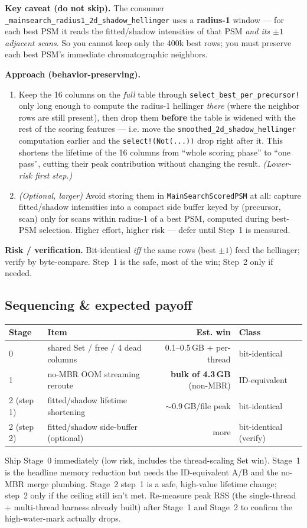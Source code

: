 \documentclass[11pt]{article}
\newcommand{\code}[1]{\texttt{\small #1}}
\begin{document}
\textbf{Key caveat (do not skip).} The consumer
\code{\_mainsearch\_radius1\_2d\_shadow\_hellinger} uses a \textbf{radius-1} window --- for each
best PSM it reads the fitted/shadow intensities of that PSM \emph{and its $\pm1$ adjacent scans}.
So you cannot keep only the 400k best rows; you must preserve each best PSM's immediate
chromatographic neighbors.

\textbf{Approach (behavior-preserving).}
\begin{enumerate}
  \item Keep the 16 columns on the \emph{full} table through \code{select\_best\_per\_precursor!}
  only long enough to compute the radius-1 hellinger \emph{there} (where the neighbor rows are
  still present), then drop them \textbf{before} the table is widened with the rest of the
  scoring features --- i.e. move the \code{smoothed\_2d\_shadow\_hellinger} computation earlier
  and the \code{select!(Not(...))} drop right after it. This shortens the lifetime of the 16
  columns from ``whole scoring phase'' to ``one pass'', cutting their peak contribution without
  changing the result. \emph{(Lower-risk first step.)}
  \item \emph{(Optional, larger)} Avoid storing them in \code{MainSearchScoredPSM} at all:
  capture fitted/shadow intensities into a compact side buffer keyed by (precursor, scan) only
  for scans within radius-1 of a best PSM, computed during best-PSM selection. Higher effort,
  higher risk --- defer until Step~1 is measured.
\end{enumerate}
\textbf{Risk / verification.} Bit-identical \emph{iff} the same rows (best $\pm1$) feed the
hellinger; verify by byte-compare. Step~1 is the safe, most of the win; Step~2 only if needed.

\subsection*{Sequencing \& expected payoff}
\begin{center}
\begin{tabular}{llrl}
\toprule
\textbf{Stage} & \textbf{Item} & \textbf{Est. win} & \textbf{Class} \\
\midrule
0 & shared Set / free / 4 dead columns & 0.1--0.5\,GB + per-thread & bit-identical \\
1 & no-MBR OOM streaming reroute & \textbf{bulk of 4.3\,GB} (non-MBR) & ID-equivalent \\
2 (step 1) & fitted/shadow lifetime shortening & $\sim$0.9\,GB/file peak & bit-identical \\
2 (step 2) & fitted/shadow side-buffer (optional) & more & bit-identical (verify) \\
\bottomrule
\end{tabular}
\end{center}
\noindent Ship Stage~0 immediately (low risk, includes the thread-scaling Set win). Stage~1 is
the headline memory reduction but needs the ID-equivalent A/B and the no-MBR merge plumbing.
Stage~2 step~1 is a safe, high-value lifetime change; step~2 only if the ceiling still isn't met.
Re-measure peak RSS (the single-thread + multi-thread harness already built) after Stage~1 and
Stage~2 to confirm the high-water-mark actually drops.
\end{document}
